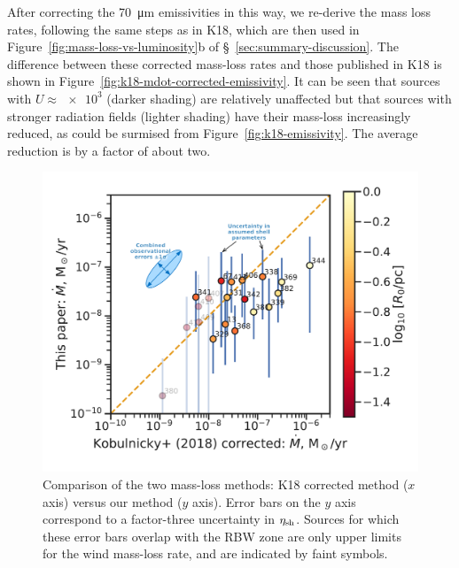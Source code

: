 After correcting the \SI{70}{\um} emissivities in this way, we
re-derive the mass loss rates, following the same steps as in K18,
which are then used in Figure~\ref{fig:mass-loss-vs-luminosity}b of
\S~\ref{sec:summary-discussion}.  The difference between these
corrected mass-loss rates and those published in K18 is shown in
Figure~\ref{fig:k18-mdot-corrected-emissivity}.  It can be seen that
sources with \(U \approx \num{e3}\) (darker shading) are relatively
unaffected but that sources with stronger radiation fields (lighter
shading) have their mass-loss increasingly reduced, as could be
surmised from Figure~\ref{fig:k18-emissivity}.  The average reduction
is by a factor of about two.

\begin{figure}
  \centering
  \includegraphics[width=\linewidth]{figs/K18-mdot-corrected-comparison-R0-edited}
  \caption{Comparison of the two mass-loss methods: K18 corrected
    method (\(x\) axis) versus our method (\(y\) axis).  Error bars on
    the \(y\) axis correspond to a factor-three uncertainty in
    \(\eta_{\text{sh}}\).  Sources for which these error bars overlap with
    the RBW zone are only upper limits for the wind mass-loss rate,
    and are indicated by faint symbols.}
  \label{fig:mass-loss-comparison}
\end{figure}

